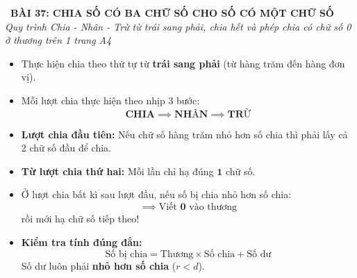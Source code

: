 \documentclass[11pt,a4paper]{article}
\begin{document}
\begin{tcolorbox}[
  enhanced,
  colback=white,
  colframe=primary,
  arc=3mm,
  boxrule=1.2pt,
  left=4mm, right=4mm, top=2.5mm, bottom=2.5mm,
  drop shadow=black!10!white
]
  \centering
  {\Large\bfseries\color{primary}\faBookmark\ BÀI 37: CHIA SỐ CÓ BA CHỮ SỐ CHO SỐ CÓ MỘT CHỮ SỐ}\\[1.5mm]
  {\small\itshape\color{black!75}Quy trình Chia - Nhân - Trừ từ trái sang phải, chia hết và phép chia có chữ số 0 ở thương trên 1 trang A4}
\end{tcolorbox}

\vspace{-2mm}


\noindent
\begin{minipage}[t]{0.49\textwidth}\vspace{0pt}
\begin{tcolorbox}[
  enhanced,
  colback=blue!4!white,
  colframe=blue!75!black,
  arc=2mm, boxrule=0.8pt,
  left=2mm, right=2mm, top=1.8mm, bottom=1.8mm,
  title={\footnotesize\bfseries\color{white}\faCalculator\ 1. Quy trình đặt tính và chia}
]
{\footnotesize
\begin{itemize}\setlength{\itemsep}{1.5pt}\setlength{\leftskip}{-2.5mm}
  \item Thực hiện chia theo thứ tự từ \textbf{trái sang phải} (từ hàng trăm đến hàng đơn vị).
  \item Mỗi lượt chia thực hiện theo nhịp 3 bước:
  $$\mathbf{\text{CHIA}} \implies \mathbf{\text{NHÂN}} \implies \mathbf{\text{TRỪ}}$$
  \item \textbf{Lượt chia đầu tiên:} Nếu chữ số hàng trăm nhỏ hơn số chia thì phải lấy cả 2 chữ số đầu để chia.
  \item \textbf{Từ lượt chia thứ hai:} Mỗi lần chỉ hạ đúng $\mathbf{1}$ chữ số.
\end{itemize}
}
\end{tcolorbox}
\end{minipage}
\hfill
\begin{minipage}[t]{0.49\textwidth}\vspace{0pt}
\begin{tcolorbox}[
  enhanced,
  colback=teal!4!white,
  colframe=teal!75!black,
  arc=2mm, boxrule=0.8pt,
  left=2mm, right=2mm, top=1.8mm, bottom=1.8mm,
  title={\footnotesize\bfseries\color{white}\faKey\ 2. Trường hợp đặc biệt chữ số 0 ở thương}
]
{\footnotesize
\begin{itemize}\setlength{\itemsep}{1.5pt}\setlength{\leftskip}{-2.5mm}
  \item Ở lượt chia bất kì sau lượt đầu, nếu số bị chia nhỏ hơn số chia:
  $$\implies \text{Viết } \mathbf{0} \text{ vào thương}$$
  rồi mới hạ chữ số tiếp theo!
  \item \textbf{Kiểm tra tính đúng đắn:}
  $$\text{Số bị chia} = \text{Thương} \times \text{Số chia} + \text{Số dư}$$
  Số dư luôn phải \textbf{nhỏ hơn số chia} ($r < d$).
\end{itemize}
}
\end{tcolorbox}
\end{minipage}
\end{document}
